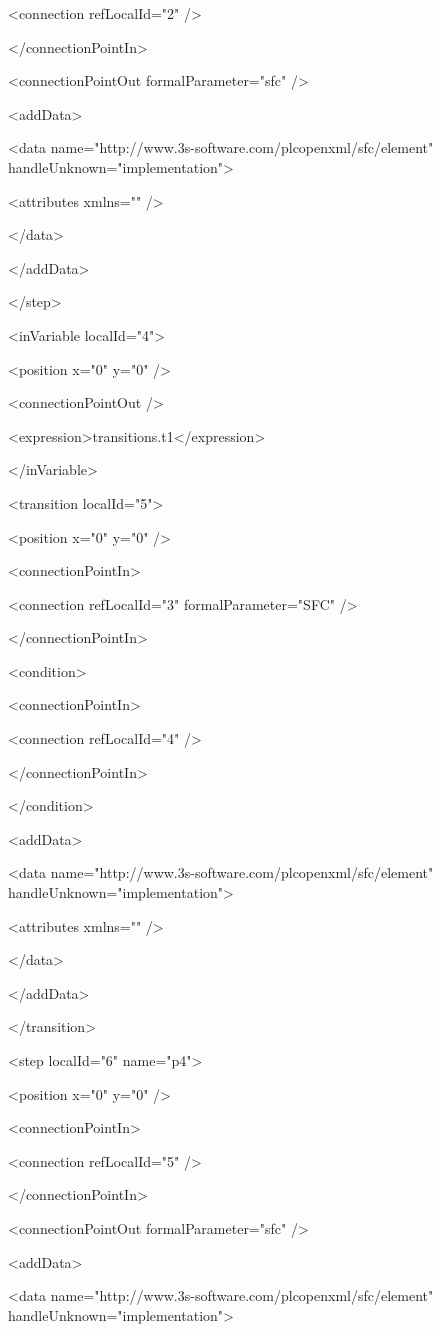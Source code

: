 {   <connection refLocalId="2" />

  </connectionPointIn>

  <connectionPointOut formalParameter="sfc" />

  <addData>

   <data name="http://www.3s-software.com/plcopenxml/sfc/element" handleUnknown="implementation">

    <attributes xmlns="" />

   </data>

  </addData>

 </step>

 <inVariable localId="4">

  <position x="0" y="0" />

  <connectionPointOut />

  <expression>transitions.t1</expression>

 </inVariable>

 <transition localId="5">

  <position x="0" y="0" />

  <connectionPointIn>

   <connection refLocalId="3" formalParameter="SFC" />

  </connectionPointIn>

  <condition>

   <connectionPointIn>

    <connection refLocalId="4" />

   </connectionPointIn>

  </condition>

  <addData>

   <data name="http://www.3s-software.com/plcopenxml/sfc/element" handleUnknown="implementation">

    <attributes xmlns="" />

   </data>

  </addData>

 </transition>

 <step localId="6" name="p4">

  <position x="0" y="0" />

  <connectionPointIn>

   <connection refLocalId="5" />

  </connectionPointIn>

  <connectionPointOut formalParameter="sfc" />

  <addData>

   <data name="http://www.3s-software.com/plcopenxml/sfc/element" handleUnknown="implementation">

}
